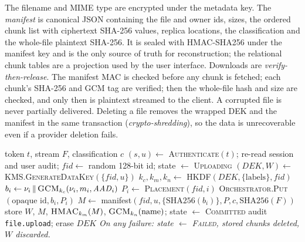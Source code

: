 \documentclass[conference]{IEEEtran}
\begin{document}
The filename and MIME type are encrypted under the metadata key. The \emph{manifest} is canonical JSON containing the file and owner ids, sizes, the ordered chunk list with ciphertext SHA-256 values, replica locations, the classification and the whole-file plaintext SHA-256. It is sealed with HMAC-SHA256 under the manifest key and is the only source of truth for reconstruction; the relational chunk tables are a projection used by the user interface. Downloads are \emph{verify-then-release}. The manifest MAC is checked before any chunk is fetched; each chunk's SHA-256 and GCM tag are verified; then the whole-file hash and size are checked, and only then is plaintext streamed to the client. A corrupted file is never partially delivered. Deleting a file removes the wrapped DEK and the manifest in the same transaction (\emph{crypto-shredding}), so the data is unrecoverable even if a provider deletion fails.

\begin{algorithm}[t]
\caption{Upload (simplified)}
\label{alg:upload}
\small
\begin{algorithmic}[1]
\Require token $t$, stream $F$, classification $c$
\State $(s,u)\gets$ \textsc{Authenticate}$(t)$; re-read session and user
 \State audit;  \EndIf
\State $\mathit{fid}\gets$ random 128-bit id; state $\gets$ \textsc{Uploading}
\State $(\mathit{DEK}, W)\gets$ \textsc{KMS.GenerateDataKey}$(\{\mathit{fid},u\})$
\State $k_c,k_m,k_n\gets$ \textsc{HKDF}$(\mathit{DEK},\{\text{labels}\},\mathit{fid})$
  \State $b_i\gets \nu_i\,\|\,\textsc{GCM}_{k_c}(\nu_i, m_i, \mathit{AAD}_i)$
  \State $P_i\gets$ \textsc{Placement}$(\mathit{fid}, i)$ 
  \State \textsc{Orchestrator.Put}$(\text{opaque id}, b_i, P_i)$ 
\EndFor
\State $M\gets$ manifest$(\mathit{fid},u,\{\mathrm{SHA256}(b_i)\},P,c,\mathrm{SHA256}(F))$
\State store $W$, $M$, $\textsc{HMAC}_{k_m}(M)$, $\textsc{GCM}_{k_n}(\text{name})$; state $\gets$ \textsc{Committed}
\State audit \texttt{file.upload}; erase $\mathit{DEK}$
\Statex \emph{On any failure: state $\gets$ \textsc{Failed}, stored chunks deleted, $W$ discarded.}
\end{algorithmic}
\end{algorithm}
\end{document}
